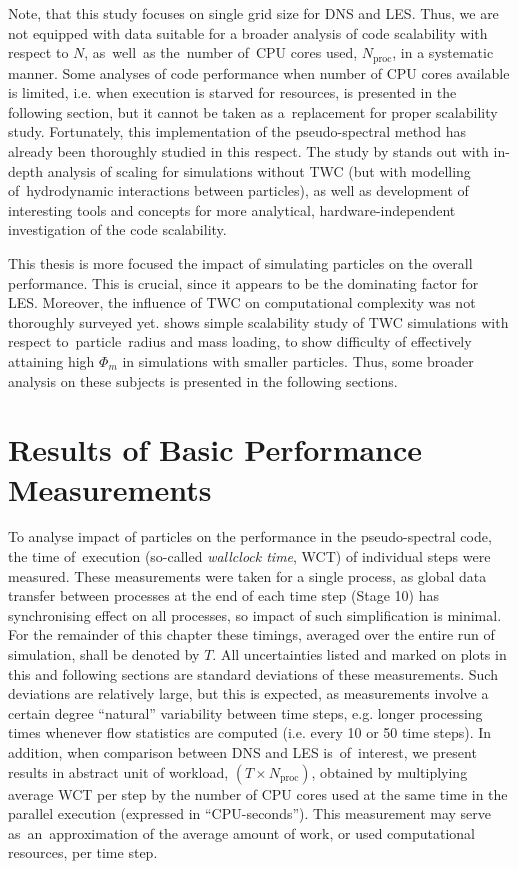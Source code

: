 \documentclass{pracamgren}
\begin{document}
\smallskip

Note, that this study focuses on single grid size for DNS and LES.
Thus, we are not equipped with data suitable for a broader analysis of code scalability with respect to $N$, as~well~as the~number of~CPU cores used, $N_{\text{proc}}$, in a systematic manner.
Some analyses of code performance when number of CPU cores available is limited, i.e. when execution is starved for resources, is presented in the following section, but it cannot be taken as a~replacement for proper scalability study.
Fortunately, this implementation of the pseudo-spectral method has already been thoroughly studied in this respect.
The study by \textcite{Ayala2014} stands out with in-depth analysis of scaling for simulations without TWC (but with modelling of~hydrodynamic interactions between particles), as well as development of interesting tools and concepts for more analytical, hardware-independent investigation of the code scalability. 

This thesis is more focused the impact of simulating particles on the overall performance.
This is crucial, since it appears to be the dominating factor for LES.
Moreover, the influence of TWC on computational complexity was not thoroughly surveyed yet.
\textcite[Fig. 1]{Rosa2022} shows simple scalability study of TWC simulations with respect to~particle~radius and mass loading, to show difficulty of effectively attaining high $\Phi_m$ in simulations with smaller particles.
Thus, some broader analysis on these subjects is presented in the following sections.



\section{Results of Basic Performance Measurements}
\label{sc:ch3.perfs}

To analyse impact of particles on the performance in the pseudo-spectral code, the time of~execution (so-called \emph{wallclock time}, WCT) of individual steps were measured.
These measurements were taken for a single process, as global data transfer between processes at the end of each time step (Stage 10) has synchronising effect on all processes, so impact of such simplification is minimal.
For the remainder of this chapter these timings, averaged over the entire run of simulation, shall be denoted by $T$.
All uncertainties listed and marked on plots in this and following sections are standard deviations of these measurements.
Such deviations are relatively large, but this is expected, as measurements involve a certain degree ``natural'' variability between time steps, e.g. longer processing times  whenever flow statistics are computed (i.e. every 10 or 50 time steps).
In addition, when comparison between DNS and LES is~of~interest, we present results in abstract unit of workload, $(T \times N_{\text{proc}})$, obtained by multiplying average WCT per step by the number of CPU cores used at the same time in the parallel execution (expressed in ``CPU-seconds'').
This measurement may serve as~an~approximation of the average amount of work, or used computational resources, per time step.
\end{document}

